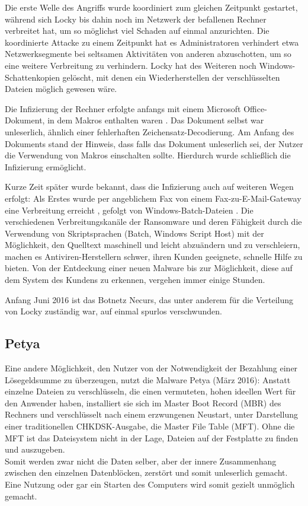Die erste Welle des Angriffs wurde koordiniert zum gleichen Zeitpunkt gestartet, während sich Locky bis dahin noch im Netzwerk der befallenen Rechner verbreitet hat, um so möglichst viel Schaden auf einmal anzurichten. Die koordinierte Attacke zu einem Zeitpunkt hat es Administratoren verhindert etwa Netzwerksegmente bei seltsamen Aktivitäten von anderen abzuschotten, um so eine weitere Verbreitung zu verhindern. Locky hat des Weiteren noch Windows-Schattenkopien gelöscht, mit denen ein Wiederherstellen der verschlüsselten Dateien möglich gewesen wäre. \cite{locky:start}

Die Infizierung der Rechner erfolgte anfangs mit einem Microsoft Office-Dokument, in dem Makros enthalten waren \cite{locky:infection}. Das Dokument selbst war unleserlich, ähnlich einer fehlerhaften Zeichensatz-Decodierung. Am Anfang des Dokuments stand der Hinweis, dass falls das Dokument unleserlich sei, der Nutzer die Verwendung von Makros einschalten sollte. Hierdurch wurde schließlich die Infizierung ermöglicht.

Kurze Zeit später wurde bekannt, dass die Infizierung auch auf weiteren Wegen erfolgt: Als Erstes wurde per angeblichem Fax von einem Fax-zu-E-Mail-Gateway eine Verbreitung erreicht \cite{locky:fax}, gefolgt von Windows-Batch-Dateien \cite{locky:batch}. Die verschiedenen Verbreitungskanäle der Ransomware und deren Fähigkeit durch die Verwendung von Skriptsprachen (Batch, Windows Script Host) mit der Möglichkeit, den Quelltext maschinell und leicht abzuändern und zu verschleiern, machen es Antiviren-Herstellern schwer, ihren Kunden geeignete, schnelle Hilfe zu bieten. Von der Entdeckung einer neuen Malware bis zur Möglichkeit, diese auf dem System des Kundens zu erkennen, vergehen immer einige Stunden.

Anfang Juni 2016 ist das Botnetz \glqq Necurs\grqq, das unter anderem für die Verteilung von Locky zuständig war, auf einmal spurlos verschwunden. \cite{locky:end}

		
\subsection{Petya}
Eine andere Möglichkeit, den Nutzer von der Notwendigkeit der Bezahlung einer Lösegeldsumme zu überzeugen, nutzt die Malware \glqq Petya\grqq{} (März 2016): Anstatt einzelne Dateien zu verschlüsseln, die einen vermuteten, hohen ideellen Wert für den Anwender haben, installiert sie sich im Master Boot Record (MBR) des Rechners und verschlüsselt nach einem erzwungenen Neustart, unter Darstellung einer traditionellen CHKDSK-Ausgabe, die Master File Table (MFT). Ohne die MFT ist das Dateisystem nicht in der Lage, Dateien auf der Festplatte zu finden und auszugeben. \cite{petya:start} \\
Somit werden zwar nicht die Daten selber, aber der innere Zusammenhang zwischen den einzelnen Datenblöcken, zerstört und somit unleserlich gemacht. Eine Nutzung oder gar ein Starten des Computers wird somit gezielt unmöglich gemacht.

